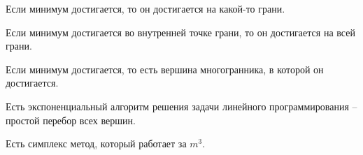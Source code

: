 \documentclass[document.tex]{subfiles}
\begin{document}
\begin{statement}
Если минимум достигается, то он достигается на какой-то грани.
\end{statement}

\begin{statement}
Если минимум достигается во внутренней точке грани, то он достигается на всей грани.
\end{statement}

\begin{corollary}
Если минимум достигается, то есть вершина многогранника, в которой он достигается.
\end{corollary}

\begin{corollary}
Есть экспоненциальный алгоритм решения задачи линейного программирования -- простой перебор всех вершин.
\end{corollary}

\begin{remark}
Есть симплекс метод, который работает за $m^3$.
\end{remark}
\end{document}

